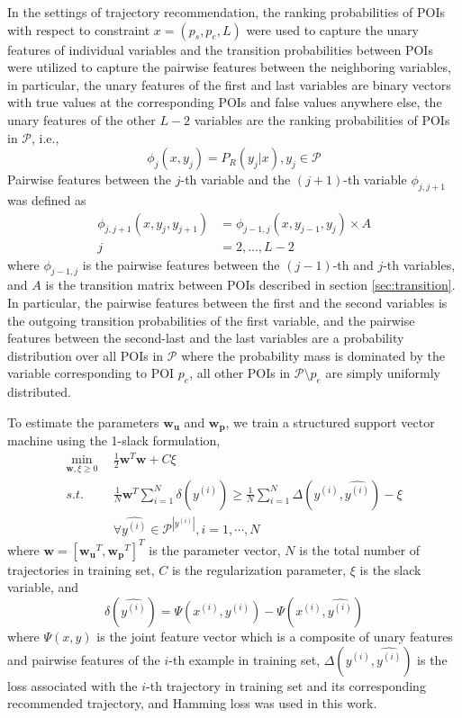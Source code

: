 In the settings of trajectory recommendation, the ranking probabilities of POIs
with respect to constraint $x = (p_s, p_e, L)$ were used to capture the unary features of individual variables
and the transition probabilities between POIs were utilized to capture the pairwise features
between the neighboring variables, in particular,
the unary features of the first and last variables are binary vectors
with true values at the corresponding POIs and false values anywhere else,
the unary features of the other $L-2$ variables are the ranking probabilities of POIs in $\mathcal{P}$, i.e.,
\begin{displaymath}
    \phi_j(x, y_j) = P_R(y_j | x), y_j \in \mathcal{P}
\end{displaymath}
Pairwise features between the $j$-th variable and the $(j+1)$-th variable $\phi_{j, j+1}$ was defined as
\begin{align*}
    \phi_{j, j+1}(x, y_j, y_{j+1}) &= \phi_{j-1, j}(x, y_{j-1}, y_j) \times A \\
                                 j &=2, \dots, L-2
\end{align*}
where $\phi_{j-1, j}$ is the pairwise features between the $(j-1)$-th and $j$-th variables,
and $A$ is the transition matrix between POIs described in section \ref{sec:transition}.
In particular, the pairwise features between the first and the second variables is the
outgoing transition probabilities of the first variable,
and the pairwise features between the second-last and the last variables are a probability distribution
over all POIs in $\mathcal{P}$ where the probability mass is dominated by the variable corresponding to POI $p_e$,
all other POIs in $\mathcal{P} \setminus p_e$ are simply uniformly distributed.


To estimate the parameters $\mathbf{w_u}$ and $\mathbf{w_p}$, we train a structured support vector machine
using the 1-slack formulation\cite{ssvm09},
\begin{align*}
    \min_{\mathbf{w}, \xi \ge 0} ~~& \frac{1}{2} \mathbf{w}^T \mathbf{w} + C \xi \\
    s.t. ~~& \frac{1}{N} \mathbf{w}^T \sum_{i=1}^N \delta(\hat{y^{(i)}}) \ge
                  \frac{1}{N} \sum_{i=1}^N \Delta(y^{(i)}, \hat{y^{(i)}}) - \xi \\
         ~~& \forall \hat{y^{(i)}} \in \mathcal{P}^{|y^{(i)}|}, i = 1, \cdots, N
\end{align*}
where $\mathbf{w} = [\mathbf{w_u}^T, \mathbf{w_p}^T]^T$ is the parameter vector,
$N$ is the total number of trajectories in training set, $C$ is the regularization parameter,
$\xi$ is the slack variable, and
\begin{displaymath}
    \delta(\hat{y^{(i)}}) = \Psi(x^{(i)}, y^{(i)}) - \Psi(x^{(i)}, \hat{y^{(i)}})
\end{displaymath}
where $\Psi(x, y)$ is the joint feature vector which is a composite of unary features and pairwise features of the
$i$-th example in training set,
$\Delta(y^{(i)}, \hat{y^{(i)}})$ is the loss associated with the $i$-th trajectory in training set and
its corresponding recommended trajectory, and Hamming loss was used in this work.

